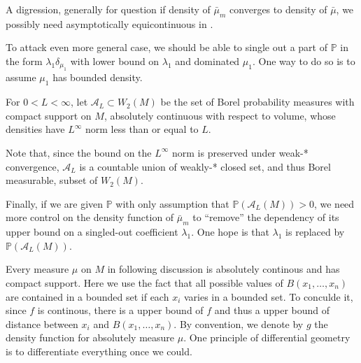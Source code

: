 A digression, generally for question if density of $\bar{\mu}_m$ converges to density of $\bar{\mu}$,
we possibly need asymptotically equicontinuous in \cite{Sweeting1986Converse}.

To attack even more general case,
we should be able to single out a part of $\mathbb{P}$ in the form $\lambda_1 \delta_{\mu_1}$
with lower bound on $\lambda_1$ and dominated $\mu_1$.
One way to do so is to assume $\mu_1$ has bounded density.
\begin{defn}
	For \( 0 < L < \infty \), let \( \mathcal { A } _ { L } \subset W_2(M) \) be the set of Borel probability
	measures with compact support on \( M \), absolutely continuous with respect to volume, whose densities have \( L ^ { \infty } \)
	norm less than or equal to \( L\).
\end{defn}

Note that, since the bound on the \( L ^ { \infty } \) norm is preserved under weak-* convergence,
\( \mathcal { A } _ { L } \) is a countable union of weakly-* closed set, and thus Borel measurable, subset of \( W_2( M ) \).


Finally, if we are given $\mathbb{P}$ with only assumption that $\mathbb{P}(\mathcal{A}_L(M)) > 0$,
we need more control on the density function of $\bar{\mu}_m$
to ``remove'' the dependency of its upper bound on a singled-out coefficient $\lambda_1$.
One hope is that $\lambda_1$ is replaced by $\mathbb{P}(\mathcal{A}_L(M))$.


Every measure $\mu$ on $M$ in following discussion is absolutely continous and has compact support.
Here we use the fact that all possible values of $B(x_1, \ldots, x_n)$ are contained in a bounded set if each $x_i$ varies in a bounded set.
To conculde it, since $f$ is continous, there is a upper bound of $f$ and thus a upper bound of distance between $x_i$ and $B(x_1, \ldots, x_n)$.
By convention, we denote by $g$ the density function for absolutely measure $\mu$.
One principle of differential geometry is to differentiate everything once we could.

